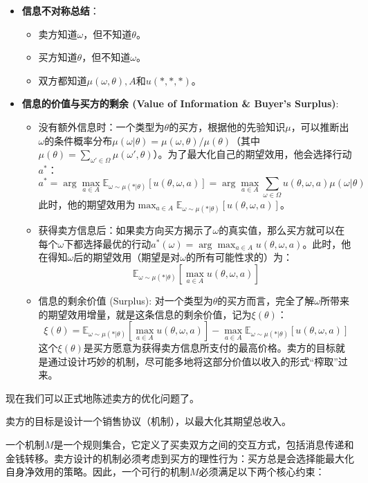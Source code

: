 \begin{itemize}
\begin{itemize}
       \end{itemize}
    \item \textbf{信息不对称总结}：
       \begin{itemize}
         \item 卖方知道$\omega$，但不知道$\theta$。
         \item 买方知道$\theta$，但不知道$\omega$。
         \item 双方都知道$\mu(\omega,\theta),A$和$u(*,*,*)$。
       \end{itemize}
    \item \textbf{信息的价值与买方的剩余 (Value of Information \& Buyer's Surplus)}:
      \begin{itemize}
         \item 没有额外信息时：一个类型为$\theta$的买方，根据他的先验知识$\mu$，可以推断出$\omega$的条件概率分布$\mu(\omega | \theta)=\mu(\omega,\theta)/ \mu(\theta)$（其中$\mu(\theta)=\sum\limits_{\omega' \in \Omega} \mu(\omega',\theta)$）。为了最大化自己的期望效用，他会选择行动$a^*$：$$a^*=\arg \max_{a\in A} \mathbb{E}_{\omega \sim \mu(*|\theta)} [u(\theta,\omega,a)] = \arg \max_{a\in A} \sum\limits_{\omega \in \Omega} u(\theta,\omega,a)\mu(\omega|\theta)$$此时，他的期望效用为$\max_{a\in A}\mathbb{E}_{\omega \sim \mu(*|\theta)}[u(\theta,\omega,a)]$。
         \item 获得卖方信息后：如果卖方向买方揭示了$\omega$的真实值，那么买方就可以在每个$\omega$下都选择最优的行动$a^*(\omega)=\arg \max_{a\in A}u(\theta,\omega,a)$。此时，他在得知$\omega$后的期望效用（期望是对$\omega$的所有可能性求的）为：$$\mathbb{E}_{\omega\sim\mu(*|\theta)}[\max_{a\in A}u(\theta,\omega,a)]$$
         \item 信息的剩余价值 (Surplus): 对一个类型为$\theta$的买方而言，完全了解$\omega$所带来的期望效用增量，就是这条信息的剩余价值，记为$\xi(\theta)$：$$\xi(\theta)=\mathbb{E}_{\omega\sim\mu(*|\theta)}[\max_{a\in A}u(\theta,\omega,a)] - \max_{a\in A}\mathbb{E}_{\omega\sim\mu(*|\theta)}[u(\theta,\omega,a)]$$ 这个$\xi(\theta)$是买方愿意为获得卖方信息所支付的最高价格。卖方的目标就是通过设计巧妙的机制，尽可能多地将这部分价值以收入的形式“榨取”过来。
      \end{itemize}
 \end{itemize}

 现在我们可以正式地陈述卖方的优化问题了。

 卖方的目标是设计一个销售协议（机制），以最大化其期望总收入。

 一个机制$M$是一个规则集合，它定义了买卖双方之间的交互方式，包括消息传递和金钱转移。卖方设计的机制必须考虑到买方的理性行为：买方总是会选择能最大化自身净效用的策略。因此，一个可行的机制$M$必须满足以下两个核心约束：

